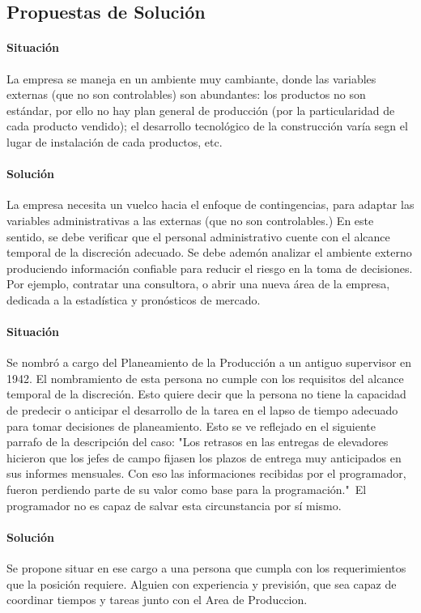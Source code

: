 \documentclass[12pt,a4paper,spanish]{article}
\begin{document}
\subsection{Propuestas de Soluci\'on}

\paragraph{Situaci\'on}
La empresa se maneja en un ambiente muy cambiante, donde las variables externas (que no son controlables) son abundantes: los productos no son est\'andar, por ello no hay plan general de producci\'on (por la particularidad de cada producto vendido); el desarrollo tecnol\'ogico de la construcci\'on var\'ia segn el lugar de instalaci\'on de cada productos, etc.
\paragraph{Soluci\'on}
La empresa necesita un vuelco hacia el enfoque de contingencias, para adaptar las variables administrativas a las externas (que no son controlables.) En este sentido, se debe verificar que el personal administrativo cuente con el alcance temporal de la discreci\'on adecuado. Se debe adem\'on analizar el ambiente externo produciendo informaci\'on confiable para reducir el riesgo en la toma de decisiones. Por ejemplo, contratar una consultora, o abrir una nueva \'area de la empresa, dedicada a la estad\'istica y pron\'osticos de mercado.

\paragraph{Situaci\'on}
Se nombr\'o a cargo del Planeamiento de la Producci\'on a un antiguo supervisor en 1942. El nombramiento de esta persona no cumple con los requisitos del alcance temporal de la discreci\'on. Esto quiere decir que la persona no tiene la capacidad de predecir o anticipar el desarrollo de la tarea en el lapso de tiempo adecuado para tomar decisiones de planeamiento. Esto se ve reflejado en el siguiente parrafo de la descripci\'on del caso: "Los retrasos en las entregas de elevadores hicieron que los jefes de campo fijasen los plazos de entrega muy anticipados en sus informes mensuales. Con eso las informaciones recibidas por el programador, fueron perdiendo parte de su valor como base para la programaci\'on."\ El programador no es capaz de salvar esta circunstancia por s\'i mismo.
\paragraph{Soluci\'on}
Se propone situar en ese cargo a una persona que cumpla con los requerimientos que la posici\'on requiere. Alguien con experiencia y previsi\'on, que sea capaz de coordinar tiempos y tareas junto con el Area de Produccion.
\end{document}
